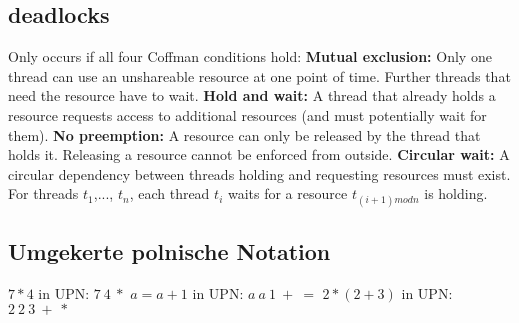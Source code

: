 \documentclass{article}
\begin{document}
\subsection{deadlocks}
Only occurs if all four Coffman conditions hold:\newline
\textbf{Mutual exclusion:} Only one thread can use an unshareable resource at one point of time. Further threads that need the resource have to wait.\newline
\textbf{Hold and wait:} A thread that already holds a resource requests access to additional resources (and must potentially wait for them).\newline
\textbf{No preemption:} A resource can only be released by the thread that holds it. Releasing a resource cannot be enforced from outside.\newline
\textbf{Circular wait:} A circular dependency between threads holding and requesting resources must exist. For threads $t_1$,..., $t_n$, each thread $t_i$ waits for a resource $t_{(i+1) mod n}$ is holding.\newline


\subsection{Umgekerte polnische Notation}

$7*4$ in UPN: $7~4~*$\newline
$a=a+1$ in UPN: $a~a~1~+~=$\newline
$2*(2+3)$ in UPN: $2~2~3~+~*$\newline
\end{document}
